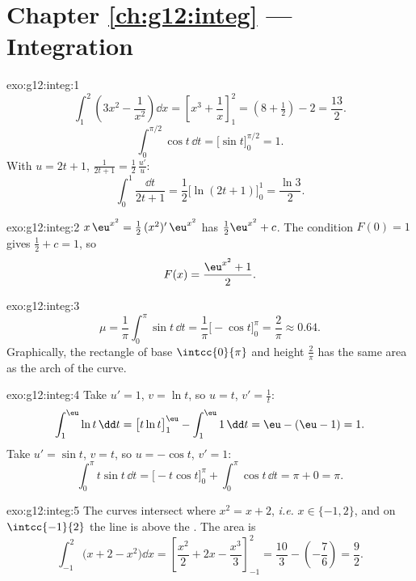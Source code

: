\section*{Chapter \ref{ch:g12:integ} --- Integration}

\begin{solution}{exo:g12:integ:1}
\[
\int_1^2 \left(3x^2 - \frac{1}{x^2}\right)\dd x
= \left[x^3 + \frac1x\right]_1^2 = \left(8 + \tfrac12\right) - 2 = \frac{13}{2}.
\]
\[
\int_0^{\pi/2} \cos t\,\dd t = \bigl[\sin t\bigr]_0^{\pi/2} = 1 .
\]
With $u = 2t+1$, $\frac{1}{2t+1} = \frac12\,\frac{u'}{u}$:
\[
\int_0^1 \frac{\dd t}{2t+1} = \frac12\bigl[\ln(2t+1)\bigr]_0^1
= \frac{\ln 3}{2}.
\]
\end{solution}

\begin{solution}{exo:g12:integ:2}
$x\,\eu^{x^2} = \frac12\,(x^2)'\,\eu^{x^2}$ has 
$\frac12\eu^{x^2} + c$. The condition $F(0) = 1$ gives $\frac12 + c = 1$,
so
\[
F(x) = \frac{\eu^{x^2} + 1}{2}.
\]
\end{solution}

\begin{solution}{exo:g12:integ:3}
\[
\mu = \frac{1}{\pi}\int_0^\pi \sin t\,\dd t
= \frac{1}{\pi}\bigl[-\cos t\bigr]_0^\pi = \frac{2}{\pi} \approx 0.64 .
\]
Graphically, the rectangle of base $\intcc{0}{\pi}$ and height
$\frac{2}{\pi}$ has the same area as the arch of the  curve.
\end{solution}

\begin{solution}{exo:g12:integ:4}
Take $u' = 1$, $v = \ln t$, so $u = t$, $v' = \frac1t$:
\[
\int_1^{\eu} \ln t\,\dd t = \bigl[t\ln t\bigr]_1^{\eu} - \int_1^{\eu} 1\,\dd t
= \eu - (\eu - 1) = 1 .
\]
Take $u' = \sin t$, $v = t$, so $u = -\cos t$, $v' = 1$:
\[
\int_0^\pi t\sin t\,\dd t = \bigl[-t\cos t\bigr]_0^\pi + \int_0^\pi \cos t\,\dd t
= \pi + 0 = \pi .
\]
\end{solution}

\begin{solution}{exo:g12:integ:5}
The curves intersect where $x^2 = x + 2$, \emph{i.e.} $x \in \{-1, 2\}$, and
on $\intcc{-1}{2}$ the line is above the . The area is
\[
\int_{-1}^{2} \bigl(x + 2 - x^2\bigr)\dd x
= \left[\frac{x^2}{2} + 2x - \frac{x^3}{3}\right]_{-1}^{2}
= \frac{10}{3} - \left(-\frac{7}{6}\right) = \frac{9}{2}.
\]
\end{solution}

